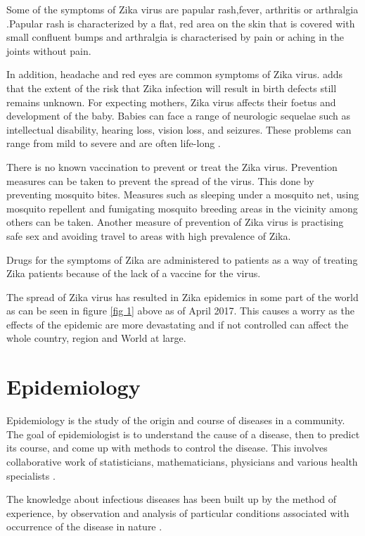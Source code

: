 Some of the symptoms of Zika virus  are papular rash,fever, arthritis or arthralgia \cite{musso2015}.Papular rash is  characterized by a flat, red area on the skin that is covered with small confluent bumps and arthralgia is characterised by pain or aching in the joints without pain.

In addition, headache and red eyes are common symptoms of Zika virus. \cite{simoes2016zika}  adds that the extent of the risk that Zika infection will result in birth defects still remains unknown. For expecting mothers, Zika virus affects their foetus and development of the baby. Babies can face a range of neurologic sequelae such as intellectual disability, hearing loss, vision loss, and seizures. These problems can range from mild to severe and are often life-long \citep{rasmussen2016zika}.

There is no known vaccination to prevent or treat the Zika virus. Prevention measures can be taken to prevent the spread of the virus. This done by preventing mosquito bites. Measures such as sleeping under a mosquito net, using mosquito repellent and fumigating mosquito breeding areas in the vicinity among others can be taken. Another measure of prevention of Zika virus is practising safe sex and avoiding travel to areas with high prevalence of Zika.

Drugs for the symptoms of Zika are administered to patients as a way of treating Zika patients because of the lack of a vaccine for the virus.


The spread of Zika virus has resulted in Zika epidemics in some part of the world as can be seen in figure \ref{fig 1} above as of April 2017. This causes a worry as the effects of the epidemic are more devastating and if not controlled can affect the whole country, region and World at large. 


 \section{Epidemiology}
 
Epidemiology is the study of the origin and course of diseases in a community. The goal of epidemiologist is to understand the cause of a disease, then to predict its course, and come up with methods to control the disease. This involves collaborative work of statisticians, mathematicians, physicians and various health specialists \citep{Brauer2017}.

The knowledge about infectious diseases has been built up by the method of experience, by observation and analysis of particular conditions associated with occurrence of the disease in nature \citep{frost1923importance}.
 
